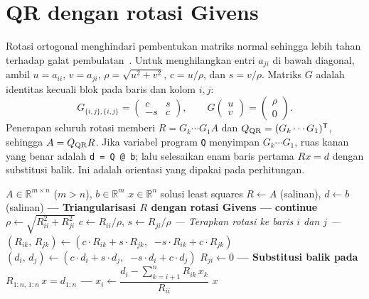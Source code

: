 \documentclass[12pt,a4paper]{article}
\numberwithin{equation}{section}
\newcommand{\R}{\mathbb{R}}
\begin{document}
\section{QR dengan rotasi Givens}
Rotasi ortogonal menghindari pembentukan matriks normal sehingga lebih tahan terhadap galat pembulatan~\cite{golub,trefethen,higham}. Untuk menghilangkan entri $a_{ji}$ di bawah diagonal, ambil $u=a_{ii}$, $v=a_{ji}$, $\rho=\sqrt{u^2+v^2}$, $c=u/\rho$, dan $s=v/\rho$. Matriks $G$ adalah identitas kecuali blok pada baris dan kolom $i,j$:
\begin{equation}
G_{\{i,j\},\{i,j\}}=\begin{pmatrix}c&s\\-s&c\end{pmatrix},\qquad
G\begin{pmatrix}u\\v\end{pmatrix}=\begin{pmatrix}\rho\\0\end{pmatrix}.
\end{equation}
Penerapan seluruh rotasi memberi $R=G_k\cdots G_1A$ dan $Q_{\rm QR}=(G_k\cdots G_1)^\mathsf{T}$, sehingga $A=Q_{\rm QR}R$. Jika variabel program \texttt{Q} menyimpan $G_k\cdots G_1$, ruas kanan yang benar adalah \texttt{d = Q @ b}; lalu selesaikan enam baris pertama $Rx=d$ dengan substitusi balik. Ini adalah orientasi yang dipakai pada perhitungan.

\begin{algorithm}[H]
\caption{Penyelesaian Least Squares via QR Rotasi Givens}
\begin{algorithmic}[1]
\Require $A\in\R^{m\times n}$ ($m > n$), $b\in\R^m$
\Ensure $x\in\R^n$ solusi least squares
\State $R \gets A$ (salinan), \; $d \gets b$ (salinan)
\Statex \textbf{--- Triangularisasi $R$ dengan rotasi Givens ---}
 
     
            \State \textbf{continue} 
        \EndIf
        \State $\rho \gets \sqrt{R_{ii}^2 + R_{ji}^2}$
        \State $c \gets R_{ii} / \rho$, \;\; $s \gets R_{ji} / \rho$
        \Statex \hspace{2.5em} \textit{--- Terapkan rotasi ke baris $i$ dan $j$ ---}
         
            \State $(R_{ik},\, R_{jk}) \gets (c \cdot R_{ik} + s \cdot R_{jk},\;\; {-s} \cdot R_{ik} + c \cdot R_{jk})$
        \EndFor
        \State $(d_i,\, d_j) \gets (c \cdot d_i + s \cdot d_j,\;\; {-s} \cdot d_i + c \cdot d_j)$ 
        \State $R_{ji} \gets 0$
    \EndFor
\EndFor
\Statex \textbf{--- Substitusi balik pada $R_{1:n,\,1:n}\, x = d_{1:n}$ ---}
    \State $x_i \gets \dfrac{d_i - \sum_{k=i+1}^{n} R_{ik}\, x_k}{R_{ii}}$
\EndFor
\State \Return $x$
\end{algorithmic}
\end{algorithm}
\end{document}
